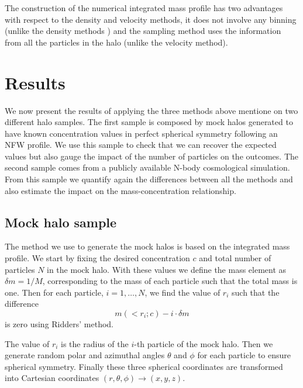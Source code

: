 \documentclass[a4,useAMS,usenatbib,usegraphicx]{mn2e}
\begin{document}
The construction of the numerical integrated mass profile has two
advantages with respect to the density and velocity methods, it does
not involve any binning (unlike the density methods ) and the
sampling method uses the information from all the particles in the
halo (unlike the velocity method). 


\section{Results}
\label{sec:results}

We now present the results of applying the three methods above
mentione on two different halo samples.
The first sample is composed by mock halos generated to have known
concentration values in perfect spherical symmetry following an NFW
profile.
We use this sample to check that we can recover the expected values
but also gauge the impact of the number of particles on the outcomes.
The second sample comes from a publicly available N-body cosmological
simulation.
From this sample we quantify again the differences between all the
methods and also estimate the impact on the mass-concentration
relationship.


\subsection{Mock halo sample}

The method we use to generate the mock halos is based on the integrated
mass profile.
We start by fixing the desired concentration $c$ and total number of
particles $N$ in the mock halo.
With these values we define the mass element as $\delta m = 1/M$, corresponding
to the mass of each particle such that the total mass is one.
Then for each particle, $i=1,\ldots,N$, we find the value of $r_i$ such that
the difference
%
\begin{equation}
m(<r_i;c) - i \cdot \delta m
\end{equation}
%
is zero using Ridders' method.

The value of $r_i$ is the radius of the $i$-th particle of the mock
halo.
Then we generate random polar and azimuthal angles $\theta$ and $\phi$
for each particle to ensure spherical symmetry.
Finally these three spherical coordinates are transformed into Cartesian coordinates
$(r,\theta,\phi) \rightarrow (x,y,z)$.
\end{document}
